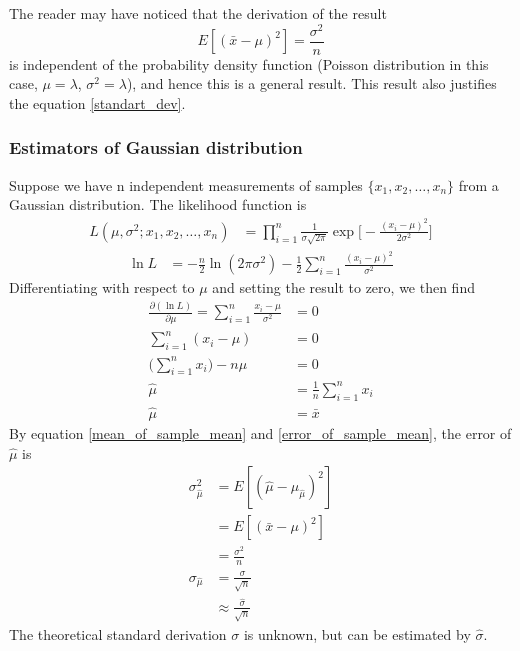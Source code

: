 \documentclass[12pt,a4paper]{report}
\begin{document}
The reader may have noticed that the derivation of the result
\begin{equation} \label{error_of_sample_mean}
E[(\bar{x} - \mu )^2] = \frac{\sigma^2}{n}
\end{equation}
is independent of the probability density function (Poisson distribution in this case, $\mu=\lambda$, $\sigma^2=\lambda$), and hence this is a general result. This result also justifies the equation \ref{standart_dev}.

\subsubsection{Estimators of Gaussian distribution}
Suppose we have n independent measurements of samples $\{ x_1, x_2, \dots , x_n \}$ from a Gaussian distribution. The likelihood function is
\begin{align*}
L(\mu, \sigma^2 ;x_1,x_2,\dots,x_n) &= \prod_{i = 1}^{n} \frac{1}{\sigma \sqrt{2\pi}} \exp \Bigg[ - \frac{(x_i-\mu)^2}{2\sigma^2} \Bigg]
\end{align*}
\begin{align*}
\ln L
&= -\frac{n}{2} \ln(2 \pi \sigma^2) - \frac{1}{2} \sum_{i = 1}^{n} \frac{(x_i - \mu)^2}{\sigma^2}
\end{align*}
Differentiating with respect to $\mu$ and setting the result to zero, we then find
\begin{align*}
\frac{\partial ( \ln L )}{\partial \mu} =
\sum_{i = 1}^{n} \frac{x_i - \mu}{\sigma^2} &= 0 \\
\sum_{i = 1}^{n} (x_i - \mu) &= 0 \\
\Bigg(\sum_{i = 1}^{n} x_i \Bigg) - n \mu &= 0 \\
\hat{\mu} &= \frac{1}{n} \sum_{i = 1}^{n} x_i \\
\hat{\mu} &= \bar{x}
\end{align*}
By equation \ref{mean_of_sample_mean} and \ref{error_of_sample_mean}, the error of $\hat{\mu}$ is
\begin{align}
\sigma_{\hat{\mu}}^2
&= E[(\hat{\mu} - \mu_{\hat{\mu}} )^2] \\
&= E[(\bar{x} - \mu )^2] \\
&= \frac{\sigma^2}{n} \\
\sigma_{\hat{\mu}} &= \frac{\sigma}{\sqrt{n}} \\
&\approx \frac{\hat{\sigma}}{\sqrt{n}} \label{error_of_estimator_mu}
\end{align}
The theoretical standard derivation $\sigma$ is unknown, but can be estimated by $\hat{\sigma}$.
\end{document}
